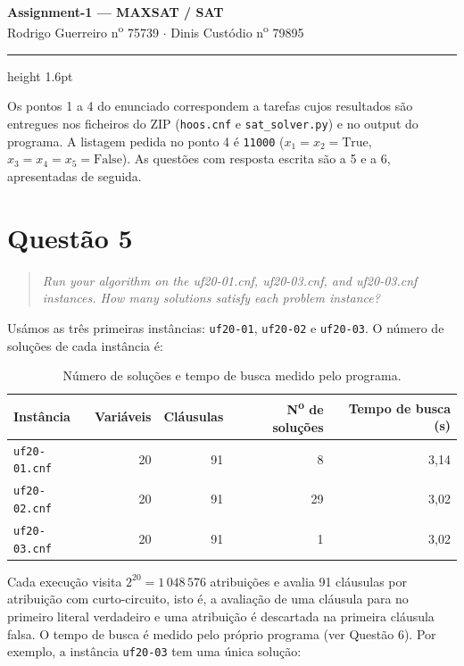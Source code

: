 \documentclass[11pt,a4paper]{article}
\begin{document}
\begin{center}
  {\LARGE\bfseries\color{azul} Assignment-1 --- MAXSAT / SAT}\\[3pt]
  {\large Rodrigo Guerreiro n\textsuperscript{o} 75739 $\cdot$ Dinis Custódio n\textsuperscript{o} 79895}
\end{center}
\vspace{2pt}
{\color{azul}\hrule height 1.6pt}
\vspace{10pt}

Os pontos 1 a 4 do enunciado correspondem a tarefas cujos resultados são entregues nos
ficheiros do ZIP (\texttt{hoos.cnf} e \texttt{sat\_solver.py}) e no output do programa.
A listagem pedida no ponto 4 é \texttt{11000} ($x_1=x_2=\text{True}$,
$x_3=x_4=x_5=\text{False}$). As questões com resposta escrita são a 5 e a 6, apresentadas
de seguida.

\section{Questão 5}

\begin{quote}\itshape
Run your algorithm on the uf20-01.cnf, uf20-03.cnf, and uf20-03.cnf instances.
How many solutions satisfy each problem instance?
\end{quote}

Usámos as três primeiras instâncias: \texttt{uf20-01}, \texttt{uf20-02} e
\texttt{uf20-03}. O número de soluções de cada instância é:

\begin{table}[h]
  \centering
  \begin{tabular}{lrrrr}
    \toprule
    \textbf{Instância} & \textbf{Variáveis} & \textbf{Cláusulas} & \textbf{N\textsuperscript{o} de soluções} & \textbf{Tempo de busca (s)} \\
    \midrule
    \texttt{uf20-01.cnf} & 20 & 91 & 8  & 3,14 \\
    \texttt{uf20-02.cnf} & 20 & 91 & 29 & 3,02 \\
    \texttt{uf20-03.cnf} & 20 & 91 & 1  & 3,02 \\
    \bottomrule
  \end{tabular}
  \caption{Número de soluções e tempo de busca medido pelo programa.}
\end{table}

Cada execução visita $2^{20} = 1\,048\,576$ atribuições e avalia 91 cláusulas por
atribuição com curto-circuito, isto é, a avaliação de uma cláusula para no primeiro
literal verdadeiro e uma atribuição é descartada na primeira cláusula falsa. O tempo
de busca é medido pelo próprio programa (ver Questão 6). Por exemplo, a instância
\texttt{uf20-03} tem uma única solução:
\end{document}

